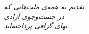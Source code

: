 \thispagestyle{empty}
\vspace*{6cm}
\begin{center}
  {\Large\itshape\color{PrimaryMid}
  تقدیم به همه‌ی ملت‌هایی که\\[8pt]
  در جست‌وجوی آزادی\\[8pt]
  بهای گزافی پرداخته‌اند.}
\end{center}
\vspace*{\fill}
\cleardoublepage